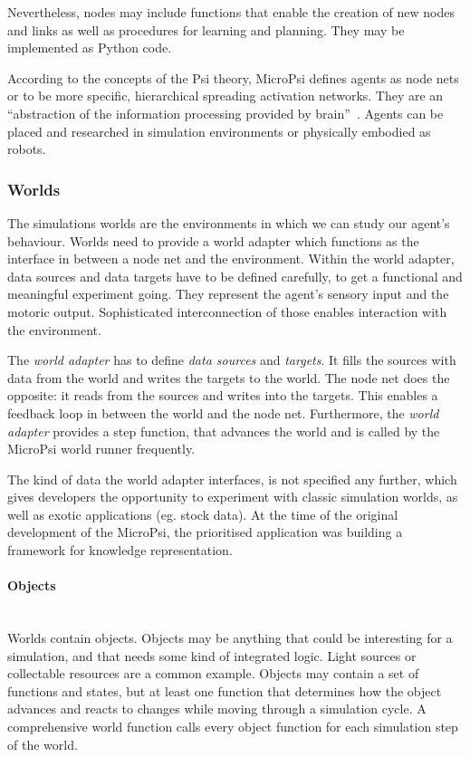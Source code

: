 Nevertheless, nodes may include functions that enable the creation of new nodes and links as well as procedures for learning and planning. They may be implemented as Python code.

According to the concepts of the Psi theory, MicroPsi defines agents as node nets or to be more specific, hierarchical spreading activation networks. They are an ``abstraction of the information processing provided by brain''~\cite{conf/agi/Bach12}. Agents can be placed and researched in simulation environments or physically embodied as robots.


        \subsubsection{Worlds}
        \label{microPsiWorld}
The simulations worlds are the environments in which we can study our agent's behaviour. Worlds need to provide a world adapter which functions as the interface in between a node net and the environment. Within the world adapter, data sources and data targets have to be defined carefully, to get a functional and meaningful experiment going. They represent the agent's sensory input and the motoric output. Sophisticated interconnection of those enables interaction with the environment.

The \emph{world adapter} has to define \emph{data sources} and \emph{targets}. It fills the sources with data from the world and writes the targets to the world. The node net does the opposite: it reads from the sources and writes into the targets. This enables a feedback loop in between the world and the node net. Furthermore, the \emph{world adapter} provides a step function, that advances the world and is called by the MicroPsi world runner frequently.


The kind of data the world adapter interfaces, is not specified any further, which gives developers the opportunity to experiment with classic simulation worlds, as well as exotic applications (eg. stock data). At the time of the original development of the MicroPsi, the prioritised application was building a framework for knowledge representation.

            \paragraph{Objects}$\;$ \\
Worlds contain objects. Objects may be anything that could be interesting for a simulation, and that needs some kind of integrated logic. Light sources or collectable resources are a common example. Objects may contain a set of functions and states, but at least one function that determines how the object advances and reacts to changes while moving through a simulation cycle. A comprehensive world function calls every object function for each simulation step of the world.

